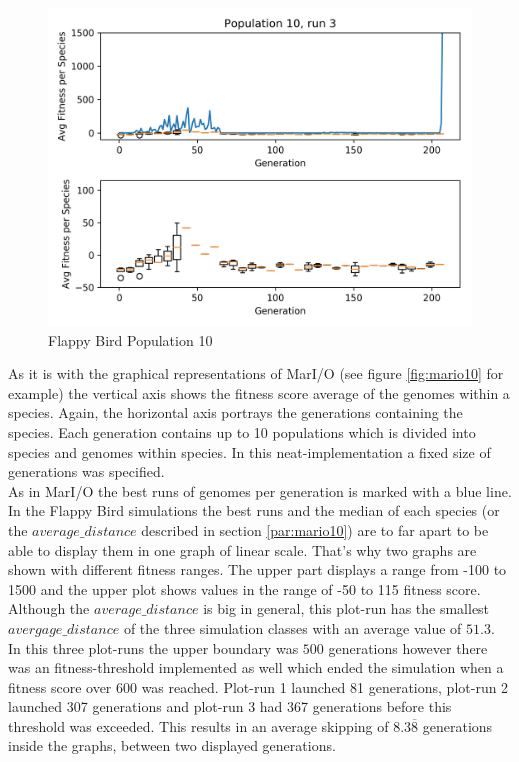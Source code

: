 \begin{figure}[h!]
				\begin{minipage}{0.33\textwidth}
					\centering
					\includegraphics[width=1\textwidth]{graphics/flappy/pop10_run3} %
				\end{minipage}
				\caption{Flappy Bird Population 10}
				\label{fig:flappy10}
			\end{figure}
			As it is with the graphical representations of MarI/O (see figure \ref{fig:mario10} for example) the vertical axis shows the fitness score average of the genomes within a species. Again, the horizontal axis portrays the generations containing the species. Each generation contains up to 10 populations which is divided into species and genomes within species. In this \gls{neat}-implementation a fixed size of generations was specified.\\
			As in MarI/O the best runs of genomes per generation is marked with a blue line. In the Flappy Bird simulations the best runs and the median of each species (or the $average\_distance$ described in section \ref{par:mario10}) are to far apart to be able to display them in one graph of linear scale. That's why two graphs are shown with different fitness ranges. The upper part displays a range from -100 to 1500 and the upper plot shows values in the range of -50 to 115 fitness score.\\
			Although the $average\_distance$  is big in general, this plot-run has the smallest $avergage\_distance$ of the three simulation classes with an average value of $51.3$.
			In this three plot-runs the upper boundary was $500$ generations however there was an fitness-threshold implemented as well which ended the simulation when a fitness score over 600 was reached. Plot-run 1 launched 81 generations, plot-run 2 launched 307 generations and plot-run 3 had 367 generations before this threshold was exceeded. This results in an average skipping of $8.3\overline{8}$ generations inside the graphs, between two displayed generations. \\
